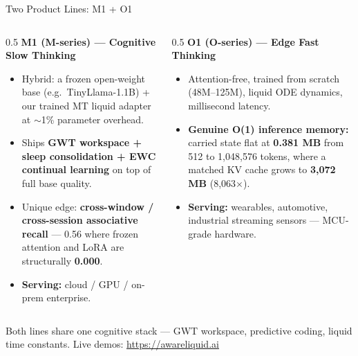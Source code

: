 \documentclass[aspectratio=169, 10pt]{beamer}
\begin{document}
\begin{frame}{Two Product Lines: M1 + O1}
\small
\begin{columns}[T]
\begin{column}{0.5\textwidth}
\textbf{M1 (M-series) --- Cognitive Slow Thinking}
\begin{itemize}\itemsep=0.3em
    \item Hybrid: a frozen open-weight base (e.g.\ TinyLlama-1.1B) + our trained MT liquid adapter at $\sim$1\% parameter overhead.
    \item Ships \textbf{GWT workspace + sleep consolidation + EWC continual learning} on top of full base quality.
    \item Unique edge: \textbf{cross-window / cross-session associative recall} --- 0.56 where frozen attention and LoRA are structurally \textbf{0.000}.
    \item \textbf{Serving:} cloud / GPU / on-prem enterprise.
\end{itemize}
\end{column}
\begin{column}{0.5\textwidth}
\textbf{O1 (O-series) --- Edge Fast Thinking}
\begin{itemize}\itemsep=0.3em
    \item Attention-free, trained from scratch (48M--125M), liquid ODE dynamics, millisecond latency.
    \item \textbf{Genuine O(1) inference memory:} carried state flat at \textbf{0.381 MB} from 512 to 1{,}048{,}576 tokens, where a matched KV cache grows to \textbf{3{,}072 MB} (8{,}063$\times$).
    \item \textbf{Serving:} wearables, automotive, industrial streaming sensors --- MCU-grade hardware.
\end{itemize}
\end{column}
\end{columns}
\vspace{0.4em}
{\footnotesize Both lines share one cognitive stack --- GWT workspace, predictive coding, liquid time constants. Live demos: \url{https://awareliquid.ai}}
\end{frame}
\end{document}

